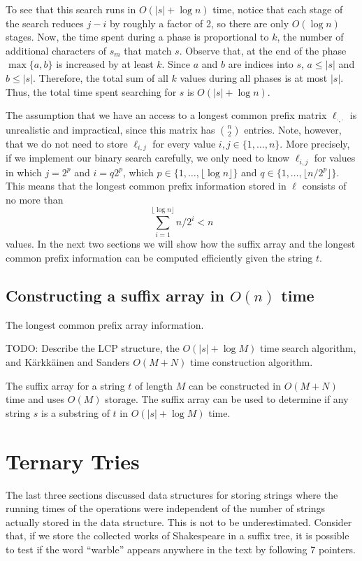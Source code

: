 To see that this search runs in $O(|s|+\log n)$ time, notice that each stage of the search reduces $j-i$ by roughly a factor of 2, so there are only $O(\log n)$ stages.  Now, the time spent during a phase is proportional to $k$, the number of additional characters of $s_m$ that match $s$.  Observe that, at the end of the phase $\max\{a,b\}$ is increased by at least $k$.  Since $a$ and $b$ are indices into $s$, $a\le|s|$ and $b\le|s|$. Therefore, the total sum of all $k$ values during all phases is at most $|s|$.  Thus, the total time spent searching for $s$ is $O(|s|+\log n)$.

The assumption that we have an access to a longest common prefix matrix $\ell_{\cdot,\cdot}$ is unrealistic and impractical, since this matrix has $\binom{n}{2}$ entries.  Note, however, that we do not need to store $\ell_{i,j}$ for every value $i,j\in\{1,\ldots,n\}$.  More precisely, if we implement our binary search carefully, we only need to know $\ell_{i,j}$ for values in which $j=2^{p}$ and $i=q2^p$, which $p\in\{1,\ldots,\lfloor \log n\rfloor\}$ and $q\in\{1,\ldots,\lfloor n/2^p\rfloor\}$. This means that the longest common prefix information stored in $\ell$ consists of no more than
\[
  \sum_{i=1}^{\lfloor\log n\rfloor} n/2^i < n
\]
values.  In the next two sections we will show how the suffix array and the longest common prefix information can be computed efficiently given the string $t$.

\subsection{Constructing a suffix array in $O(n)$ time}

The longest common prefix array information.


TODO: Describe the LCP structure, the $O(|s|+\log M)$ time search algorithm,
and K\"arkk\"ainen and Sanders $O(M+N)$ time construction algorithm.

\begin{thm}
The suffix array for a string $t$ of length $M$ can be constructed in
$O(M+N)$ time and uses $O(M)$ storage.  The suffix array can be used to
determine if any string $s$ is a substring of $t$ in $O(|s|+\log M)$ time.
\end{thm}


\section{Ternary Tries}

The last three sections discussed data structures for storing strings
where the running times of the operations were independent of the
number of strings actually stored in the data structure.  This is not
to be underestimated.  Consider that, if we store the collected works
of Shakespeare in a suffix tree, it is possible to test if the word
``warble'' appears anywhere in the text by following 7 pointers.

